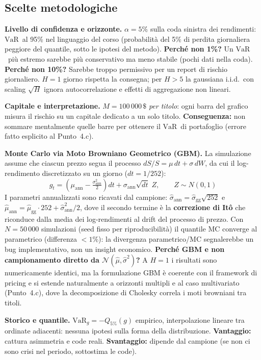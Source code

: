 \documentclass[12pt,a4paper]{article}
\newcommand{\VaR}{\ensuremath{\mathrm{VaR}}}
\newcommand{\USD}{\ensuremath{\,\$}}
\begin{document}
\subsection*{Scelte metodologiche}

\textbf{Livello di confidenza e orizzonte.} $\alpha=5\%$ sulla coda sinistra dei rendimenti: \VaR\ al 95\% nel linguaggio del corso (probabilità del 5\% di perdita giornaliera peggiore del quantile, sotto le ipotesi del metodo). \textbf{Perché non 1\%?} Un \VaR\ più estremo sarebbe più conservativo ma meno stabile (pochi dati nella coda). \textbf{Perché non 10\%?} Sarebbe troppo permissivo per un report di rischio giornaliero. $H=1$ giorno rispetta la consegna; per $H>5$ la gaussiana i.i.d.\ con scaling $\sqrt{H}$ ignora autocorrelazione e effetti di aggregazione non lineari.

\textbf{Capitale e interpretazione.} $M=100\,000\USD$ \emph{per titolo}: ogni barra del grafico misura il rischio su un capitale dedicato a un solo titolo. \textbf{Conseguenza:} non sommare mentalmente quelle barre per ottenere il \VaR\ di portafoglio (errore fatto esplicito al Punto~4.c).

\textbf{Monte Carlo via Moto Browniano Geometrico (GBM).} La simulazione assume che ciascun prezzo segua il processo $dS/S = \mu\,dt + \sigma\,dW$, da cui il log-rendimento discretizzato su un giorno ($dt = 1/252$):
\[
g_t = \left(\mu_{\text{ann}} - \tfrac{\sigma_{\text{ann}}^2}{2}\right)dt + \sigma_{\text{ann}}\sqrt{dt}\;Z, \qquad Z \sim N(0,1)
\]
I parametri annualizzati sono ricavati dal campione: $\hat\sigma_{\text{ann}} = \hat\sigma_{\text{gg}}\sqrt{252}$ e $\hat\mu_{\text{ann}} = \hat\mu_{\text{gg}} \cdot 252 + \hat\sigma_{\text{ann}}^2/2$, dove il secondo termine è la \textbf{correzione di Itô} che riconduce dalla media dei log-rendimenti al drift del processo di prezzo. Con $N=50\,000$ simulazioni (seed fisso per riproducibilità) il quantile MC converge al parametrico (differenza $<1\%$): la divergenza parametrico/MC segnalerebbe un bug implementativo, non un insight economico. \textbf{Perché GBM e non campionamento diretto da $\mathcal{N}(\hat\mu,\hat\sigma^2)$?} A $H=1$ i risultati sono numericamente identici, ma la formulazione GBM è coerente con il framework di pricing e si estende naturalmente a orizzonti multipli e al caso multivariato (Punto~4.c), dove la decomposizione di Cholesky correla i moti browniani tra titoli.

\textbf{Storico e quantile.} $\VaR_g=-Q_{5\%}(g)$ empirico, interpolazione lineare tra ordinate adiacenti: nessuna ipotesi sulla forma della distribuzione. \textbf{Vantaggio:} cattura asimmetria e code reali. \textbf{Svantaggio:} dipende dal campione (se non ci sono crisi nel periodo, sottostima le code).
\end{document}

